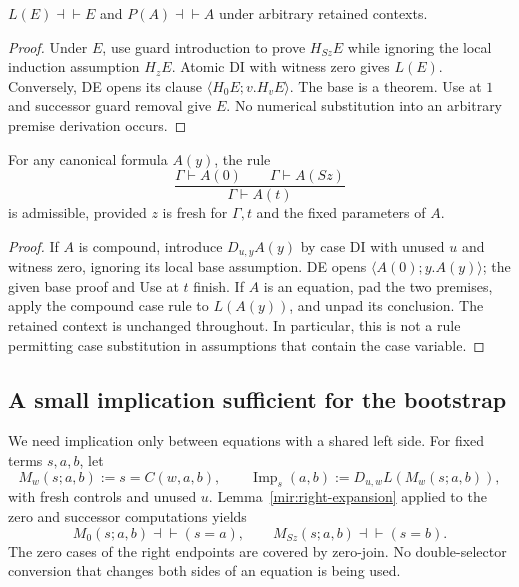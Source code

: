 \begin{lemma}[Padding]\label{mir:padding}
$L(E)\dashv\vdash E$ and $P(A)\dashv\vdash A$ under arbitrary
retained contexts.
\end{lemma}
\begin{proof}
Under $E$, use guard introduction to prove $H_{Sz}E$ while ignoring
the local induction assumption $H_zE$. Atomic DI with witness zero
gives $L(E)$. Conversely, DE opens its clause
$\langle H_0E;v.H_vE\rangle$. The base is a theorem. Use at $1$
and successor guard removal give $E$. No numerical substitution into
an arbitrary premise derivation occurs.
\end{proof}

\begin{lemma}\label{mir:cases}
For any canonical formula $A(y)$, the rule
\[
 \frac{\Gamma\vdash A(0)\qquad\Gamma\vdash A(Sz)}
      {\Gamma\vdash A(t)}
 \tag{NC}\label{mir:nc}
\]
is admissible, provided $z$ is fresh for $\Gamma,t$ and the fixed
parameters of $A$.
\end{lemma}
\begin{proof}
If $A$ is compound, introduce $D_{u,y}A(y)$ by case DI with unused
$u$ and witness zero, ignoring its local base assumption. DE opens
$\langle A(0);y.A(y)\rangle$; the given base proof and Use at $t$
finish. If $A$ is an equation, pad the two premises, apply the compound
case rule to $L(A(y))$, and unpad its conclusion. The retained context
is unchanged throughout. In particular, this is not a rule permitting
case substitution in assumptions that contain the case variable.
\end{proof}

\subsection{A small implication sufficient for the bootstrap}

We need implication only between equations with a shared left side.
For fixed terms $s,a,b$, let
\[
 M_w(s;a,b):=s=C(w,a,b),\qquad
 \operatorname{Imp}_s(a,b):=D_{u,w}L(M_w(s;a,b)),
 \tag{Shared-left implication}\label{mir:shared-implication-def}
\]
with fresh controls and unused $u$. Lemma~\ref{mir:right-expansion}
applied to the zero and successor computations yields
\[
 M_0(s;a,b)\dashv\vdash(s=a),\qquad
 M_{Sz}(s;a,b)\dashv\vdash(s=b).
 \tag{Shared-left endpoints}\label{mir:shared-endpoints}
\]
The zero cases of the right endpoints are covered by zero-join. No
double-selector conversion that changes both sides of an equation is
being used.

